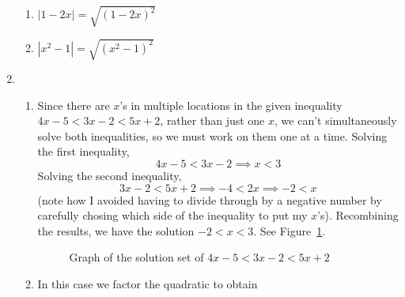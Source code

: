 \documentclass{article}
\newcommand{\ds}{\displaystyle}
\begin{document}
\begin{enumerate}
  \begin{enumerate}
  \item $\ds |1-2x| = \sqrt{(1-2x)^2}$
  \item $\ds |x^2-1| = \sqrt{(x^2-1)^2}$
  \end{enumerate}
\item %
  \begin{enumerate}
  \item %
    Since there are $x$'s in multiple locations in the given
    inequality $4x-5 < 3x-2 < 5x+2$, rather than just one $x$, we
    can't simultaneously solve both inequalities, so we must work on
    them one at a time.  Solving the first inequality,
    \begin{equation*}
      4x-5 < 3x-2 \implies x < 3
    \end{equation*}
    Solving the second inequality,
    \begin{equation*}
      3x-2 < 5x+2 \implies -4<2x \implies -2<x
    \end{equation*}
    (note how I avoided having to divide through by a negative number
    by carefully chosing which side of the inequality to put my
    $x$'s).  Recombining the results, we have the solution $-2<x<3$.
    See Figure~\ref{fig:4x-5LT3x-2LT5x+2}. 
    \begin{figure}[htbp]
      \centering
      \caption{Graph of the solution set of $4x-5<3x-2<5x+2$}
      \label{fig:4x-5LT3x-2LT5x+2}
    \end{figure}
  \item %
    In this case we factor the quadratic to obtain

\end{enumerate}
\end{enumerate}
\end{document}

